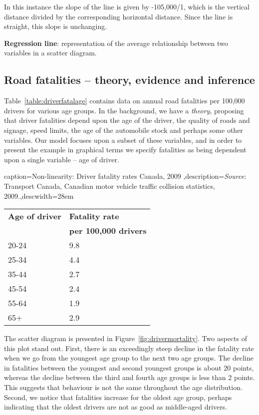 In this instance the slope of the line is given by -105,000/1, which is the
vertical distance divided by the corresponding horizontal distance. Since
the line is straight, this slope is unchanging.

\begin{DefBox}
\textbf{Regression line}: representation of the average relationship between two variables in a scatter diagram.
\end{DefBox}

\newhtmlpage

\subsection*{Road fatalities -- theory, evidence and inference}

Table~\ref{table:driverfatalage} contains data on annual road fatalities per 100,000 drivers for
various age groups. In the background, we have a \textit{theory}, proposing
that driver fatalities depend upon the age of the driver, the quality of
roads and signage, speed limits, the age of the automobile stock and perhaps
some other variables. Our model focuses upon a subset of these variables,
and in order to present the example in graphical terms we specify fatalities
as being dependent upon a single variable -- age of driver.

\begin{Table}{caption={Non-linearity: Driver fatality rates Canada, 2009 \label{table:driverfatalage}},description={\textit{Source}: Transport Canada, Canadian motor vehicle traffic collision statistics, 2009.},descwidth={28em}}
	\begin{tabu} to 25em {|X[1,c]X[1,c]|}	\hline
			\textbf{Age of driver} & \textbf{Fatality rate} \\
			&	\textbf{per 100,000 drivers}	\\
		20-24 & 9.8 \\ 
			25-34 & 4.4 \\ 
		35-44 & 2.7 \\ 
			45-54 & 2.4 \\ 
		55-64 & 1.9 \\ 
			65+ & 2.9 \\ \hline
	\end{tabu}
\end{Table}

The scatter diagram is presented in Figure~\ref{fig:drivermortality}. Two aspects of this plot
stand out. First, there is an exceedingly steep decline in the fatality rate
when we go from the youngest age group to the next two age groups. The
decline in fatalities between the youngest and second youngest groups is
about 20 points, whereas the decline between the third and fourth age groups
is less than 2 points. This suggests that behaviour is not the same
throughout the age distribution. Second, we notice that fatalities increase
for the oldest age group, perhaps indicating that the oldest drivers are not
as good as middle-aged drivers.

